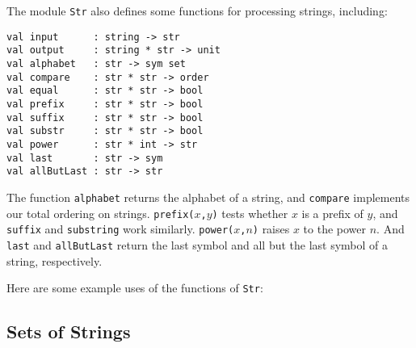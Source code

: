 The module \texttt{Str} also defines some functions for processing strings,
including:
\begin{verbatim}
val input      : string -> str
val output     : string * str -> unit
val alphabet   : str -> sym set
val compare    : str * str -> order
val equal      : str * str -> bool
val prefix     : str * str -> bool
val suffix     : str * str -> bool
val substr     : str * str -> bool
val power      : str * int -> str
val last       : str -> sym
val allButLast : str -> str
\end{verbatim}
%
%
%
%
%
%
%
%
%
%

The function \texttt{alphabet} returns the alphabet of a string,
and \texttt{compare} implements our total ordering on
strings.  \texttt{prefix($x$,\;$y$)} tests whether $x$ is a prefix of
$y$, and \texttt{suffix} and \texttt{substring} work similarly.
\texttt{power($x$,\;$n$)} raises $x$ to the power $n$.  And
\texttt{last} and \texttt{allButLast} return the last symbol and all
but the last symbol of a string, respectively.

Here are some example uses of the functions of \texttt{Str}:


\subsection{Sets of Strings}

